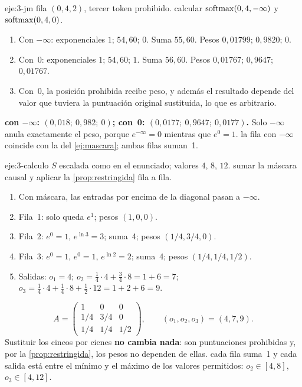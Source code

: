 \begin{solucion}{eje:3-jm}
\datos fila $(0,4,2)$, tercer token prohibido.
\planteamiento calcular $\operatorname{softmax}(0,4,-\infty)$ y $\operatorname{softmax}(0,4,0)$.
\pasos
\begin{enumerate}[label=\arabic*.]
  \item Con $-\infty$: exponenciales $1$; $54{,}60$; $0$. Suma $55{,}60$. Pesos $0{,}01799$; $0{,}9820$; $0$.
  \item Con~0: exponenciales $1$; $54{,}60$; $1$. Suma $56{,}60$. Pesos $0{,}01767$; $0{,}9647$; $0{,}01767$.
  \item Con~0, la posición prohibida recibe peso, y además el resultado depende del valor que tuviera la puntuación original sustituida, lo que es arbitrario.
\end{enumerate}
\resultado \textbf{con $-\infty$: $(0{,}018;\allowbreak\ 0{,}982;\allowbreak\ 0)$; con~0: $(0{,}0177;\allowbreak\ 0{,}9647;\allowbreak\ 0{,}0177)$.} Solo $-\infty$ anula exactamente el peso, porque $e^{-\infty}=0$ mientras que $e^{0}=1$.
\comprobacion la fila con $-\infty$ coincide con la del \cref{ej:mascara}; ambas filas suman~1.
\end{solucion}

\begin{solucion}{eje:3-calculo}
\datos $S$ escalada como en el enunciado; valores $4$, $8$, $12$.
\planteamiento sumar la máscara causal y aplicar la \cref{prop:restringida} fila a fila.
\pasos
\begin{enumerate}[label=\arabic*.]
  \item Con máscara, las entradas por encima de la diagonal pasan a $-\infty$.
  \item Fila~1: solo queda $e^{1}$; pesos $(1,0,0)$.
  \item Fila~2: $e^{0}=1$, $e^{\ln3}=3$; suma~4; pesos $(1/4,3/4,0)$.
  \item Fila~3: $e^{0}=1$, $e^{0}=1$, $e^{\ln2}=2$; suma~4; pesos $(1/4,1/4,1/2)$.
  \item Salidas: $o_1=4$; $o_2=\tfrac14\cdot4+\tfrac34\cdot8=1+6=7$; $o_3=\tfrac14\cdot4+\tfrac14\cdot8+\tfrac12\cdot12=1+2+6=9$.
\end{enumerate}
\resultado
\[
A=\begin{pmatrix}1&0&0\\1/4&3/4&0\\1/4&1/4&1/2\end{pmatrix},\qquad (o_1,o_2,o_3)=(4,7,9).
\]
Sustituir los cincos por cienes \textbf{no cambia nada}: son puntuaciones prohibidas y, por la \cref{prop:restringida}, los pesos no dependen de ellas.
\comprobacion cada fila suma~1 y cada salida está entre el mínimo y el máximo de los valores permitidos: $o_2\in[4,8]$, $o_3\in[4,12]$.
\end{solucion}

